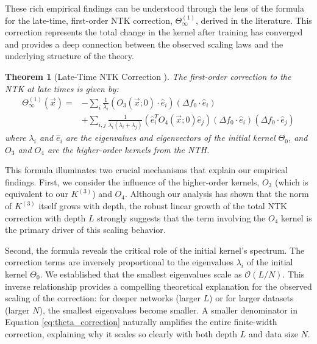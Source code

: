 \documentclass{article}
\newtheorem{theorem}{Theorem}[section]
\begin{document}
These rich empirical findings can be understood through the lens of the formula for the late-time, first-order NTK correction, $\Theta^{(1)}_\infty$, derived in the literature. This correction represents the total change in the kernel after training has converged and provides a deep connection between the observed scaling laws and the underlying structure of the theory.

\begin{theorem}[Late-Time NTK Correction \cite{large-width-feynman}]
The first-order correction to the NTK at late times is given by:
\begin{align}
\Theta^{(1)}_\infty(\vec{x}) = & -\sum_{i}\frac{1}{\lambda_{i}}(O_{3}(\vec{x};0)\cdot\hat{e}_{i})(\Delta f_{0}\cdot\hat{e}_{i}) \nonumber \\
& + \sum_{i,j}\frac{1}{\lambda_{i}(\lambda_{i}+\lambda_{j})}(\hat{e}_{i}^{T}O_{4}(\vec{x};0)\hat{e}_{j})(\Delta f_{0}\cdot \hat{e}_{i})(\Delta f_{0}\cdot \hat{e}_{j})
\label{eq:theta_correction}
\end{align}
where $\lambda_i$ and $\hat{e}_i$ are the eigenvalues and eigenvectors of the initial kernel $\Theta_0$, and $O_3$ and $O_4$ are the higher-order kernels from the NTH.
\end{theorem}

This formula illuminates two crucial mechanisms that explain our empirical findings. First, we consider the influence of the higher-order kernels, $O_3$ (which is equivalent to our $K^{(3)}$) and $O_4$. Although our analysis has shown that the norm of $K^{(3)}$ itself grows with depth, the robust linear growth of the total NTK correction with depth $L$ strongly suggests that the term involving the $O_4$ kernel is the primary driver of this scaling behavior.

Second, the formula reveals the critical role of the initial kernel's spectrum. The correction terms are inversely proportional to the eigenvalues $\lambda_i$ of the initial kernel $\Theta_0$. We established that the smallest eigenvalues scale as $\mathcal{O}(L/N)$. This inverse relationship provides a compelling theoretical explanation for the observed scaling of the correction: for deeper networks (larger $L$) or for larger datasets (larger $N$), the smallest eigenvalues become smaller. A smaller denominator in Equation \ref{eq:theta_correction} naturally amplifies the entire finite-width correction, explaining why it scales so clearly with both depth $L$ and data size $N$.
\end{document}
